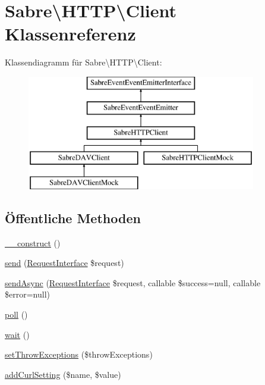 \hypertarget{class_sabre_1_1_h_t_t_p_1_1_client}{}\section{Sabre\textbackslash{}H\+T\+TP\textbackslash{}Client Klassenreferenz}
\label{class_sabre_1_1_h_t_t_p_1_1_client}
Klassendiagramm für Sabre\textbackslash{}H\+T\+TP\textbackslash{}Client\+:\begin{figure}[H]
\begin{center}
\leavevmode
\includegraphics[height=5.000000cm]{class_sabre_1_1_h_t_t_p_1_1_client}
\end{center}
\end{figure}
\subsection*{Öffentliche Methoden}
\begin{DoxyCompactItemize}
\item 
\mbox{\hyperlink{class_sabre_1_1_h_t_t_p_1_1_client_a2d20620eaf735a3286d162bca9d4960b}{\+\_\+\+\_\+construct}} ()
\item 
\mbox{\hyperlink{class_sabre_1_1_h_t_t_p_1_1_client_a7f3519f925a27ff12cf4bfa2c6980d92}{send}} (\mbox{\hyperlink{interface_sabre_1_1_h_t_t_p_1_1_request_interface}{Request\+Interface}} \$request)
\item 
\mbox{\hyperlink{class_sabre_1_1_h_t_t_p_1_1_client_a25bb46e1543b11f26ef20fc010ea60e2}{send\+Async}} (\mbox{\hyperlink{interface_sabre_1_1_h_t_t_p_1_1_request_interface}{Request\+Interface}} \$request, callable \$success=null, callable \$error=null)
\item 
\mbox{\hyperlink{class_sabre_1_1_h_t_t_p_1_1_client_a2e05ca19a5002d467fe7b2c2a50a9352}{poll}} ()
\item 
\mbox{\hyperlink{class_sabre_1_1_h_t_t_p_1_1_client_a7a549abe7af0028a19d47d9bdeaafa7b}{wait}} ()
\item 
\mbox{\hyperlink{class_sabre_1_1_h_t_t_p_1_1_client_a74054bf0fee0faa69e352bc209f07853}{set\+Throw\+Exceptions}} (\$throw\+Exceptions)
\item 
\mbox{\hyperlink{class_sabre_1_1_h_t_t_p_1_1_client_a3a384b6a3a171a642fe6b501ccd7eaa9}{add\+Curl\+Setting}} (\$name, \$value)
\end{DoxyCompactItemize}
